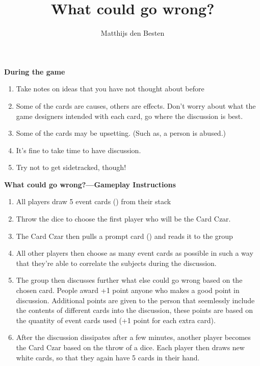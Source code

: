 \documentclass[grid,avery5371]{flashcards}
\title{What could go wrong?}
\author{Matthijs den Besten}
\begin{document}

\begin{flashcard}{
{\bf\small During the game}
\begin{multicols}{2}
\begin{enumerate}\tiny \setlength{\itemsep}{.5ex}
    \item Take notes on ideas that you have not thought about before
    \item Some of the cards are causes, others are effects. Don’t worry about what the game designers intended with each card, go where the discussion is best.
    \item Some of the cards may be upsetting. (Such as, a person is abused.)
    \item It’s fine to take time to have discussion.
    \item Try not to get sidetracked, though!
\end{enumerate}
\end{multicols}
}
{\bf\small What could go wrong?---Gameplay Instructions}
\begin{multicols}{2}
    \begin{enumerate}\tiny \setlength\itemsep{.2ex}
        \item All players draw 5 event cards () from their stack
        \item Throw the dice to choose the first player who will be the Card Czar.
        \item The Card Czar then pulls a prompt card () and reads it to the group
        \item All other players then choose as many event cards as possible in such a way that they're able to correlate the subjects during the discussion.  
        \item The group then discusses further what else could go wrong based on the chosen card. People award +1 point anyone who makes a good point in discussion. Additional points are given to the person that seemlessly include the contents of different cards into the discussion, these points are based on the quantity of event cards used (+1 point for each extra card).
        \item After the discussion dissipates after a few minutes, another player becomes the Card Czar based on the throw of a dice. Each player then draws new white cards, so that they again have 5 cards in their hand.
    \end{enumerate}
    \end{multicols}
\end{flashcard}
\end{document}

